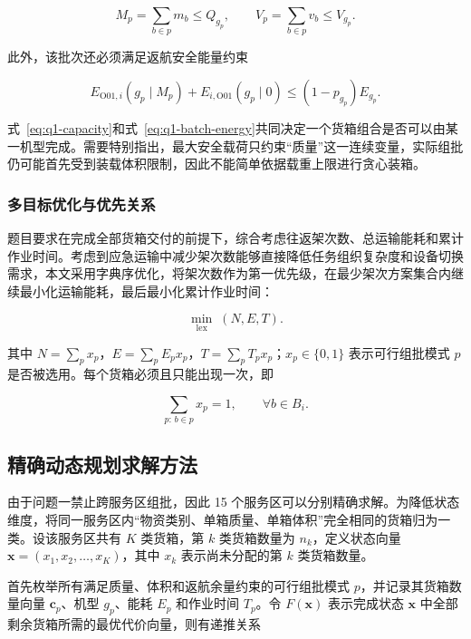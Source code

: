 \documentclass[bwprint,fontset=fandol]{gmcmthesis}
\begin{document}
\begin{equation}
M_p=\sum_{b\in p}m_b\le Q_{g_p},\qquad
V_p=\sum_{b\in p}v_b\le V_{g_p}.
\label{eq:q1-capacity}
\end{equation}

此外，该批次还必须满足返航安全能量约束

\begin{equation}
E_{\mathrm{O01},i}(g_p\mid M_p)
+E_{i,\mathrm{O01}}(g_p\mid 0)
\le (1-p_{g_p})E_{g_p}.
\label{eq:q1-batch-energy}
\end{equation}

式~\eqref{eq:q1-capacity}和式~\eqref{eq:q1-batch-energy}共同决定一个货箱组合是否可以由某一机型完成。需要特别指出，最大安全载荷只约束“质量”这一连续变量，实际组批仍可能首先受到装载体积限制，因此不能简单依据载重上限进行贪心装箱。

\subsubsection{多目标优化与优先关系}

题目要求在完成全部货箱交付的前提下，综合考虑往返架次数、总运输能耗和累计作业时间。考虑到应急运输中减少架次数能够直接降低任务组织复杂度和设备切换需求，本文采用字典序优化，将架次数作为第一优先级，在最少架次方案集合内继续最小化运输能耗，最后最小化累计作业时间：

\begin{equation}
\min_{\mathrm{lex}}\;(N,E,T).
\label{eq:q1-objective}
\end{equation}

其中 $N=\sum_p x_p$，$E=\sum_p E_p x_p$，$T=\sum_p T_p x_p$；$x_p\in\{0,1\}$ 表示可行组批模式 $p$ 是否被选用。每个货箱必须且只能出现一次，即

\begin{equation}
\sum_{p:\,b\in p}x_p=1,\qquad \forall b\in B_i.
\label{eq:q1-exact-cover}
\end{equation}

\subsection{精确动态规划求解方法}

由于问题一禁止跨服务区组批，因此 15 个服务区可以分别精确求解。为降低状态维度，将同一服务区内“物资类别、单箱质量、单箱体积”完全相同的货箱归为一类。设该服务区共有 $K$ 类货箱，第 $k$ 类货箱数量为 $n_k$，定义状态向量 $\boldsymbol{x}=(x_1,x_2,\ldots,x_K)$，其中 $x_k$ 表示尚未分配的第 $k$ 类货箱数量。

首先枚举所有满足质量、体积和返航余量约束的可行组批模式 $p$，并记录其货箱数量向量 $\boldsymbol{c}_p$、机型 $g_p$、能耗 $E_p$ 和作业时间 $T_p$。令 $F(\boldsymbol{x})$ 表示完成状态 $\boldsymbol{x}$ 中全部剩余货箱所需的最优代价向量，则有递推关系
\end{document}
